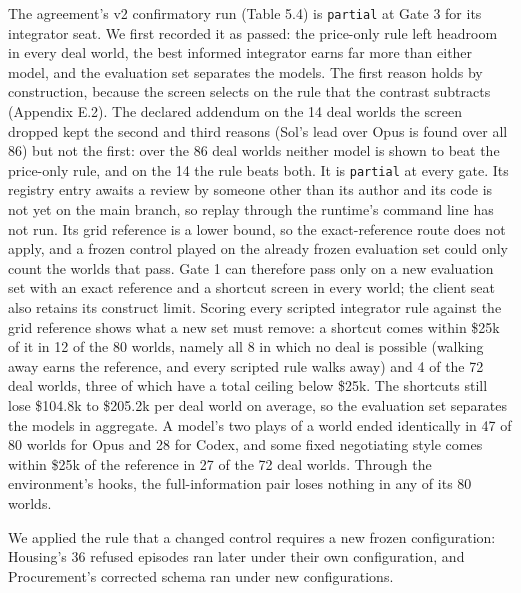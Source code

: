 The agreement's v2 confirmatory run (Table 5.4) is \texttt{partial} at Gate 3 for its integrator seat. We first recorded it
as passed: the price-only rule left headroom in every deal world, the best informed integrator earns far more than
either model, and the evaluation set separates the models. The first reason holds by construction, because the screen
selects on the rule that the contrast subtracts (Appendix E.2). The declared addendum on the 14 deal worlds the screen
dropped kept the second and third reasons (Sol's lead over Opus is found over all 86) but not the first: over the 86
deal worlds neither model is shown to beat the price-only rule, and on the 14 the rule beats both. It is \texttt{partial} at
every gate. Its registry entry awaits a review by
someone other than its author and its code is not yet on the main branch, so replay through the runtime's command line
has not run. Its grid reference is a lower bound, so the exact-reference route does not apply, and a frozen control played on the
already frozen evaluation set could only count the worlds that pass. Gate 1 can therefore pass only on a new
evaluation set with an exact reference and a shortcut screen in every world; the client seat also retains its
construct limit. Scoring every scripted integrator rule against the grid reference shows what a new set must remove: a shortcut comes within \$25k of it in 12 of the 80 worlds, namely all 8 in which no deal is possible (walking
away earns the reference, and every scripted rule walks away) and 4 of the 72 deal worlds, three of which have a total
ceiling below \$25k. The shortcuts still lose \$104.8k to \$205.2k per deal world on average, so the evaluation set
separates the models in aggregate. A model's two plays of a world ended identically in 47 of 80 worlds for Opus and 28
for Codex, and some fixed negotiating style comes within \$25k of the reference in 27 of the 72 deal worlds. Through the
environment's hooks, the full-information pair loses nothing in any of its 80 worlds.

We applied the rule that a changed control requires a new frozen configuration: Housing's 36 refused episodes ran
later under their own configuration, and Procurement's corrected schema ran under new configurations.


